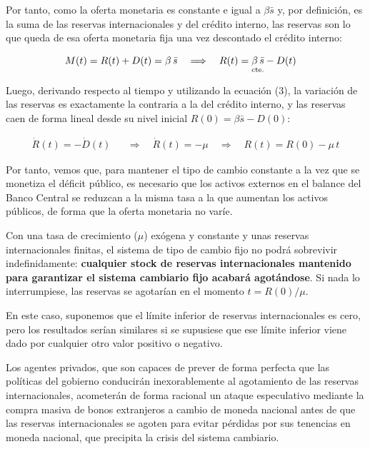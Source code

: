 \documentclass[10pt,a4paper]{article}
\begin{document}
Por tanto, como la oferta monetaria es constante e igual a $\beta\bar s$ y, por definición, es la suma de las reservas internacionales y del crédito interno, las reservas son lo que queda de esa oferta monetaria fija una vez descontado el crédito interno:

$$\begin{aligned}
  &M(t)=R(t)+D(t)=\beta\,\bar s&&\Longrightarrow\quad R(t)=\underset{\text{\scriptsize cte.}}{\beta\,\bar s}-D(t)
\end{aligned}$$

Luego, derivando respecto al tiempo y utilizando la ecuación (3), la variación de las reservas es exactamente la contraria a la del crédito interno, y las reservas caen de forma lineal desde su nivel inicial $R(0)=\beta\bar s-D(0)$:

$$\begin{aligned}
  \dot R(t)=-\dot D(t)&&\Longrightarrow\quad\boxed{\dot R(t)=-\mu}\quad\Longrightarrow\quad R(t)=R(0)-\mu\,t
\end{aligned}$$

Por tanto, vemos que, para mantener el tipo de cambio constante a la vez que se monetiza el déficit público, es necesario que los activos externos en el balance del Banco Central se reduzcan a la misma tasa a la que aumentan los activos públicos, de forma que la oferta monetaria no varíe.

Con una tasa de crecimiento ($\mu$) exógena y constante y unas reservas internacionales finitas, el sistema de tipo de cambio fijo no podrá sobrevivir indefinidamente: \textbf{cualquier stock de reservas internacionales mantenido para garantizar el sistema cambiario fijo acabará agotándose}. Si nada lo interrumpiese, las reservas se agotarían en el momento $t=R(0)/\mu$.

En este caso, suponemos que el límite inferior de reservas internacionales es cero, pero los resultados serían similares si se supusiese que ese límite inferior viene dado por cualquier otro valor positivo o negativo.


Los agentes privados, que son capaces de prever de forma perfecta que las políticas del gobierno conducirán inexorablemente al agotamiento de las reservas internacionales, acometerán de forma racional un ataque especulativo mediante la compra masiva de bonos extranjeros a cambio de moneda nacional antes de que las reservas internacionales se agoten para evitar pérdidas por sus tenencias en moneda nacional, que precipita la crisis del sistema cambiario.
\end{document}
